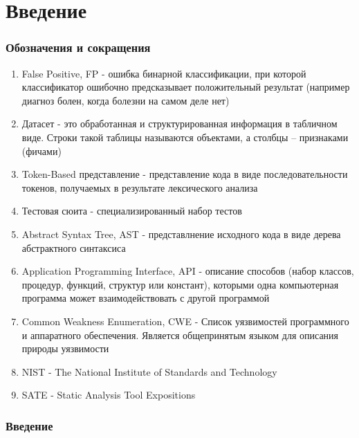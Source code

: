 \chapter{Введение}
\label{sec:Chapter0} 

\subsection*{Обозначения и сокращения}

\begin{enumerate}
    \item False Positive, FP - ошибка бинарной классификации, при которой классификатор ошибочно предсказывает положительный результат (например диагноз болен, когда болезни на самом деле нет)
    \item Датасет - это обработанная и структурированная информация в табличном виде. Строки такой таблицы называются объектами, а столбцы – признаками (фичами)
    \item Token-Based представление - представление кода в виде последовательности токенов, получаемых в результате лексического анализа
    \item Тестовая сюита - специализированный набор тестов
    \item Abstract Syntax Tree, AST - представлнение исходного кода в виде дерева абстрактного синтаксиса
    \item Application Programming Interface, API - описание способов (набор классов, процедур, функций, структур или констант), которыми одна компьютерная программа может взаимодействовать с другой программой
    \item Common Weakness Enumeration, CWE \cite{CWE-doc} - Список уязвимостей программного и аппаратного обеспечения. Является общепринятым языком для описания природы уязвимости
    \item NIST - The National Institute of Standards and Technology
    \item SATE - Static Analysis Tool Expositions
\end{enumerate}

\subsection*{Введение}

